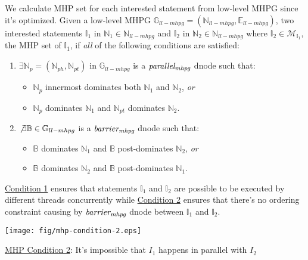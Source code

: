 We calculate MHP set for each interested statement from low-level MHPG since it's optimized. Given a low-level MHPG $\mathbb{G}_{ll-mhpg} = (\mathbb{N}_{ll-mhpg}, \mathbb{E}_{ll-mhpg})$, two interested statements $\mathbb{I}_1$ in $\mathbb{N}_1 \in \mathbb{N}_{ll-mhpg}$ and $\mathbb{I}_2$  in $\mathbb{N}_2 \in \mathbb{N}_{ll-mhpg}$ where $\mathbb{I}_2 \in \mathcal{M}_{\mathbb{I}_1}$, the MHP set of $\mathbb{I}_1$, if \textit{all} of the following conditions are satisfied:
\begin{enumerate}[label=\textbf{MHP Condition \arabic{*}.}, leftmargin=*]
	\label{MHP-Condition-1}
	\item $\exists\mathbb{N}_{p} = (\mathbb{N}_{ph}, \mathbb{N}_{pt})$ in $\mathbb{G}_{ll-mhpg}$ is a $ \textit{parallel\textsubscript{mhpg}}$ dnode such that:
	\begin{itemize}
		\item $\mathbb{N}_{p}$ innermost dominates both $\mathbb{N}_1$ and $\mathbb{N}_2$, \textit{or}
		\item $\mathbb{N}_{p}$ dominates $\mathbb{N}_1$ and $\mathbb{N}_{pt}$ dominates $\mathbb{N}_2$.
	\end{itemize}
	\label{MHP-Condition-2}
	\item $\not\exists\mathbb{B} \in \mathbb{G}_{ll-mhpg}$ is a $\textit{barrier\textsubscript{mhpg}}$ dnode such that:
	\begin{itemize}
		\item $\mathbb{B}$ dominates $\mathbb{N}_1$ and $\mathbb{B}$ post-dominates $\mathbb{N}_2$, \textit{or}
		\item $\mathbb{B}$ dominates $\mathbb{N}_2$ and $\mathbb{B}$ post-dominates $\mathbb{N}_1$.
	\end{itemize}
\end{enumerate}

\hyperref[MHP-Condition-1]{Condition 1} ensures that statements $\mathbb{I}_1$ and $\mathbb{I}_2$ are possible to be executed by different threads concurrently while \hyperref[MHP-Condition-2]{Condition 2} ensures that there's no ordering constraint causing by $\textit{barrier\textsubscript{mhpg}}$ dnode between $\mathbb{I}_1$ and $\mathbb{I}_2$.

\begin{center-figure}
	\texttt{[image: fig/mhp-condition-2.eps]}
	\caption{\hyperref[MHP-Condition-2]{MHP Condition 2}: It's impossible that $I_1$ happens in parallel with $I_2$}
	\label{fig:MHP_Condition_2}
\end{center-figure}

